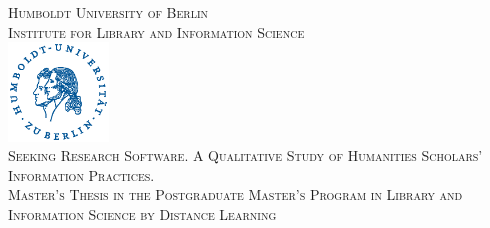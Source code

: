 \documentclass[12pt, a4paper, titlepage, oneside, abstract=true, toc=listof, toc=bibliography, BCOR=1cm]{scrreprt}
\begin{document}

\begin{titlepage} %
	\newcommand{\HRule}{\rule{\linewidth}{0.5mm}} %
	
	\center %
	
	
	\textsc{\LARGE Humboldt University of Berlin}\\[1.0cm] %
	
	\textsc{\Large Institute for Library and Information Science}\\[0.5cm] %
	
	
	
	\vfill
	\includegraphics[width=0.2\textwidth]{husiegel_bw_op.eps}\\[1cm] %

	
	
	\vfill
	{\large\textsc{Seeking Research Software. A Qualitative Study of Humanities Scholars' Information Practices.}}\\[0.8cm] %
	{\textsc{Master's Thesis in the Postgraduate Master's Program in Library and Information Science by Distance Learning}}\\
	\vfill	
	

\end{titlepage}
\end{document}
